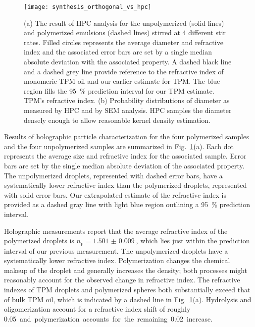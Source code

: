 \begin{figure}
    \centering
    \texttt{[image: synthesis\_orthogonal\_vs\_hpc]}
    \caption{(a) The result of HPC analysis for the unpolymerized (solid lines) and polymerized
      emulsions (dashed lines) stirred at \num{4} different stir rates. Filled circles
      represents the average diameter and refractive index and the associated error bars
      are set by a single median absolute deviation with the associated property.
      A dashed black line and a dashed grey line provide reference to the
      refractive index of monomeric TPM oil and our earlier estimate for TPM. The blue region
      fills the \SI{95}{\percent} prediction interval for our TPM estimate.
      TPM's refractive index. (b) Probability distributions of diameter as measured by
      HPC and by SEM analysis. HPC samples the diameter densely enough to allow
      reasonable kernel density estimation.}
    \label{fig:hpc_stir_rate}
\end{figure}


Results of holographic particle characterization for the four polymerized samples
and the four unpolymerized samples are summarized in Fig.~\ref{fig:hpc_stir_rate}(a).
Each dot represents the average size and refractive index for the associated sample.
Error bars are set by the single median absolute deviation of the associated property.
The unpolymerized droplets, represented with dashed error bars, have a systematically
lower refractive index than the polymerized droplets, represented with solid error bars.
Our extrapolated estimate of the refractive index is provided as a dashed gray
line with light blue region outlining a \SI{95}{\percent} prediction interval.

Holographic measurements report that the average refractive index of the
polymerized droplets
is $n_{\text{p}}=\SI{1.501(9)}{}$, which lies just within the prediction interval of our
previous measurement. The unpolymerized droplets have a systematically lower
refractive index.
Polymerization changes the chemical makeup of the droplet and generally increases the
density; %
both processes might reasonably account for the observed change in refractive index.
The refractive indexes of TPM droplets and polymerized spheres both
substantially exceed that of bulk TPM oil, which is indicated by
a dashed line in Fig.~\ref{fig:hpc_stir_rate}(a).
Hydrolysis and oligomerization account for a refractive
index shift of roughly \SI{0.05} and polymerization accounts for the remaining
\SI{0.02} increase.

